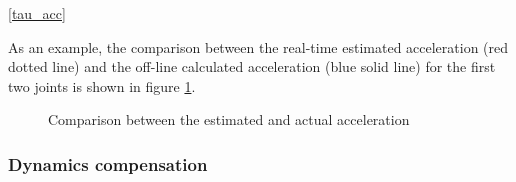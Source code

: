 \DIFaddbegin {}\eqref{tau_acc}

\DIFaddend As an example, the comparison between the real-time estimated acceleration (red dotted line) and the off-line calculated acceleration (blue solid line) for the first two joints is shown in figure \ref{fig:acceleration_validation}.
%
\begin{figure}[htb]
	\centering
\DIFdelbeginFL %
\DIFdelendFL %
	\DIFaddbeginFL \def\svgwidth{1\columnwidth}
	\begin{footnotesize}
		
	\end{footnotesize}
	\DIFaddendFL \caption{Comparison between the estimated and actual acceleration}
	\label{fig:acceleration_validation}
\end{figure}


\subsubsection{Dynamics compensation} \label{Dynamics compensation}

